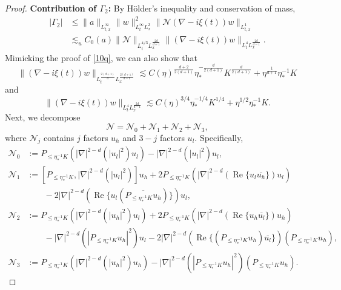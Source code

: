 \documentclass[reqno,11pt]{amsart}
\theoremstyle{plain}
\theoremstyle{definition}
\numberwithin{equation}{section}
\numberwithin{theorem}{section}
\def\leq{\leqslant}
\begin{document}
\begin{proof}
\vskip 0.1in

\textbf{Contribution of $\Gamma_2$:} By H\"older's inequality and
conservation of mass,
\begin{align*}
 |\Gamma_2|
 &\leq\|a\|_{L_{t,x}^\infty}\|w\|_{L_t^\infty L_x^2}^2
               \|\mathcal N(\nabla-i\xi(t))w\|_{L_{t,x}^1}\\
 &\lesssim_u C_0(a)\|\mathcal N\|_{L_t^{4/3}L_x^{\frac{2d}{d+1}}}
               \|(\nabla-i\xi(t))w\|_{L_t^4L_x^{\frac{2d}{d-1}}}.
\end{align*}
Mimicking the proof of \eqref{10q}, we can also show that
\begin{equation}\label{zz1}
    \| (\nabla -i\xi(t))w\|_{L_{t}^{\frac{2(d+1)}{d}}L_{x}^{\frac{2(d+1)}{d-1}}}\lesssim C(\eta)^{\frac{d+2}{2(d+1)}}\eta_{\ast}^{-\frac{d}{2(d+1)}}K^{\frac{d}{2(d+1)}}+\eta^{\frac{1}{d+1}}\eta_{\ast}^{-1}K
\end{equation}
and
\begin{equation}\label{zz12}
    \| (\nabla -i\xi(t))w\|_{L_{t}^{4}L_{x}^{\frac{2d}{d-1}}}\lesssim C(\eta)^{3/4}\eta_{\ast}^{-1/4}K^{1/4}+\eta^{1/2}\eta_{\ast}^{-1}K.
\end{equation}
Next, we decompose
\[
\mathcal{N} = \mathcal{N}_0 + \mathcal{N}_1 + \mathcal{N}_2 + \mathcal{N}_3,
\]
where $\mathcal{N}_j$ contains $j$ factors $u_{h}$ and $3 - j$ factors $u_{l}$. Specifically,
\begin{align*}
\mathcal{N}_{0} &:= P_{\leq \eta_{\ast}^{-1}K} (|\nabla|^{2-d}(|u_l|^2) u_l) - |\nabla|^{2-d}(|u_l|^2) u_l,\\
\mathcal{N}_{1} &:= [P_{\leq \eta_{\ast}^{-1}K}, |\nabla|^{2-d}(|u_l|^2)] u_h + 2P_{\leq \eta_{\ast}^{-1}K} (|\nabla|^{2-d}(\operatorname{Re}\{u_l \overline{u_h}\}) u_l) \\
&\qquad - 2|\nabla|^{2-d}(\operatorname{Re}\{u_l (\overline{P_{\leq \eta_{\ast}^{-1}K} u_h})\}) u_l,\\
\mathcal{N}_{2} &:= P_{\leq \eta_{\ast}^{-1}K} (|\nabla|^{2-d}(|u_h|^2) u_l) + 2P_{\leq \eta_{\ast}^{-1}K} (|\nabla|^{2-d}(\operatorname{Re}\{u_h \overline{u_l}\}) u_h) \\
&\qquad - |\nabla|^{2-d}(|P_{\leq \eta_{\ast}^{-1}K} u_h|^2) u_l - 2|\nabla|^{2-d}(\operatorname{Re}\{(P_{\leq \eta_{\ast}^{-1}K} u_h) \overline{u_l}\})(P_{\leq \eta_{\ast}^{-1}K} u_h),\\
\mathcal{N}_{3} &:= P_{\leq \eta_{\ast}^{-1}K} (|\nabla|^{2-d}(|u_h|^2) u_h) - |\nabla|^{2-d}(|P_{\leq \eta_{\ast}^{-1}K} u_h|^2)(P_{\leq \eta_{\ast}^{-1}K} u_h).
\end{align*}


\end{proof}
\end{document}

